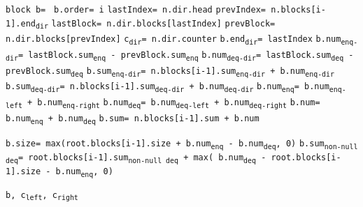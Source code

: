 \documentclass[10pt]{article}
\newcommand\keywordfont{\sffamily\bfseries}
\theoremstyle{definition}
\begin{document}
\begin{algorithm}
\begin{algorithmic}[1]
\begin{multicols}{2}
\pagebreak

\Statex{}
\State \texttt{block b= }
\State \texttt{b.order= i}
\ForEach{\texttt{dir} {\keywordfont{in}} \texttt{\{left, right\}}}
\State \texttt{lastIndex= n.dir.head} \label{lastLine}
\State \texttt{prevIndex= n.blocks[i-1].end\textsubscript{dir}} \label{prevLine}
\State \texttt{lastBlock= n.dir.blocks[lastIndex]}
\State \texttt{prevBlock= n.dir.blocks[prevIndex]}
\State \texttt{c\textsubscript{dir}= n.dir.counter}
\State \texttt{b.end\textsubscript{dir}= lastIndex}
\State \texttt{b.num\textsubscript{enq-dir}= lastBlock.sum\textsubscript{enq} - prevBlock.sum\textsubscript{enq}}
\State \texttt{b.num\textsubscript{deq-dir}= lastBlock.sum\textsubscript{deq} - prevBlock.sum\textsubscript{deq}}
\State \texttt{b.sum\textsubscript{enq-dir}= n.blocks[i-1].sum\textsubscript{enq-dir} + b.num\textsubscript{enq-dir}}
\State \texttt{b.sum\textsubscript{deq-dir}= n.blocks[i-1].sum\textsubscript{deq-dir} + b.num\textsubscript{deq-dir}}
\EndFor
\State \texttt{b.num\textsubscript{enq}= b.num\textsubscript{enq-left} + b.num\textsubscript{enq-right}}
\State \texttt{b.num\textsubscript{deq}= b.num\textsubscript{deq-left} + b.num\textsubscript{deq-right}}
\State \texttt{b.num= b.num\textsubscript{enq} + b.num\textsubscript{deq}}
\State \texttt{b.sum= n.blocks[i-1].sum + b.num}

\State \texttt{b.size= max(root.blocks[i-1].size + b.num\textsubscript{enq} - b.num\textsubscript{deq}, 0)}
\State \texttt{b.sum\textsubscript{non-null deq}= root.blocks[i-1].sum\textsubscript{non-null deq} + max( b.num\textsubscript{deq} - root.blocks[i-1].size - b.num\textsubscript{enq}, 0)}
\EndIf

\State \Return \texttt{b, c\textsubscript{left}, c\textsubscript{right}}

\end{multicols}
\end{algorithmic}
\end{algorithm}
\end{document}
